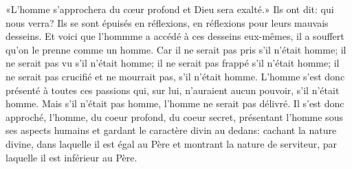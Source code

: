 «L’homme s’approchera du cœur profond et Dieu sera exalté.»
Ils ont dit: qui nous verra?
Ils se sont épuisés en réflexions, en réflexions pour leurs mauvais desseins.
Et voici que l’hommme a accédé à ces desseins eux-mêmes,
	il a souffert qu’on le prenne comme un homme.
Car il ne serait pas pris s’il n’était homme;
	il ne serait pas vu s’il n’était homme;
	il ne serait pas frappé s’il n’était homme;
	il ne serait pas crucifié et ne mourrait pas, s’il n’était homme.
L’homme s’est donc présenté à toutes ces passions
	qui, sur lui, n’auraient aucun pouvoir, s’il n’était homme.
Mais s’il n’était pas homme, l’homme ne serait pas délivré.
Il s’est donc approché, l’homme, du coeur profond, du coeur secret,
	présentant l’homme sous ses aspects humains
	et gardant le caractère divin au dedans:
	cachant la nature divine, dans laquelle il est égal au Père
	et montrant la nature de serviteur, par laquelle il est inférieur au Père.
